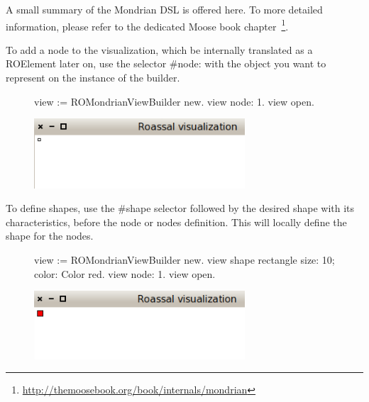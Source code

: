 \documentclass[a4paper,10pt,twoside]{book}
\begin{document}
A small summary of the Mondrian DSL is offered here. To more detailed information, please refer to the dedicated Moose book chapter~\footnote{\url{http://themoosebook.org/book/internals/mondrian}}.

To add a node to the visualization, which be internally translated as a ROElement later on, use the selector \#node: with the object you want to represent on the instance of the builder.

\begin{figure}[H]
      \begin{minipage}[t]{1\textwidth}
      \vspace{0pt}
\begin{code}{}
view := ROMondrianViewBuilder new.
view node: 1.
view open.
\end{code}
   \end{minipage}
   \hfill
   \begin{minipage}[t]{1\textwidth}
	 \vspace{0pt} \raggedright
       \centering
		\includegraphics[width=0.7\textwidth]{mondrian1}
   \end{minipage}
\label{fig:mondrian1}
\end{figure} 




To define shapes, use the \#shape selector followed by the desired shape with its characteristics, before the node or nodes definition. This will locally define the shape for the nodes.

\begin{figure}[H]
      \begin{minipage}[t]{1\textwidth}
      \vspace{0pt}
\begin{code}{}
view := ROMondrianViewBuilder new.
view shape rectangle 
	size: 10;
	color: Color red.
view node: 1.
view open.
\end{code}
   \end{minipage}
   \hfill
   \begin{minipage}[t]{1\textwidth}
	 \vspace{0pt} \raggedright
       \centering
		\includegraphics[width=0.7\textwidth]{mondrian2}
   \end{minipage}
\label{fig:mondrian2}
\end{figure} 
\end{document}
